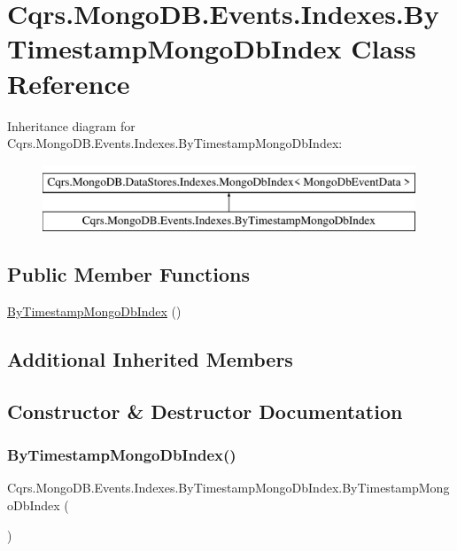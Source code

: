 \hypertarget{classCqrs_1_1MongoDB_1_1Events_1_1Indexes_1_1ByTimestampMongoDbIndex}{}\section{Cqrs.\+Mongo\+D\+B.\+Events.\+Indexes.\+By\+Timestamp\+Mongo\+Db\+Index Class Reference}
\label{classCqrs_1_1MongoDB_1_1Events_1_1Indexes_1_1ByTimestampMongoDbIndex}
Inheritance diagram for Cqrs.\+Mongo\+D\+B.\+Events.\+Indexes.\+By\+Timestamp\+Mongo\+Db\+Index\+:\begin{figure}[H]
\begin{center}
\leavevmode
\includegraphics[height=2.000000cm]{classCqrs_1_1MongoDB_1_1Events_1_1Indexes_1_1ByTimestampMongoDbIndex}
\end{center}
\end{figure}
\subsection*{Public Member Functions}
\begin{DoxyCompactItemize}
\item 
\hyperlink{classCqrs_1_1MongoDB_1_1Events_1_1Indexes_1_1ByTimestampMongoDbIndex_a642c97e253eaa259cb64b627701540c0_a642c97e253eaa259cb64b627701540c0}{By\+Timestamp\+Mongo\+Db\+Index} ()
\end{DoxyCompactItemize}
\subsection*{Additional Inherited Members}


\subsection{Constructor \& Destructor Documentation}
\mbox{\label{classCqrs_1_1MongoDB_1_1Events_1_1Indexes_1_1ByTimestampMongoDbIndex_a642c97e253eaa259cb64b627701540c0_a642c97e253eaa259cb64b627701540c0}} 
\subsubsection{\texorpdfstring{By\+Timestamp\+Mongo\+Db\+Index()}{ByTimestampMongoDbIndex()}}
{\footnotesize\ttfamily Cqrs.\+Mongo\+D\+B.\+Events.\+Indexes.\+By\+Timestamp\+Mongo\+Db\+Index.\+By\+Timestamp\+Mongo\+Db\+Index (\begin{DoxyParamCaption}{ }\end{DoxyParamCaption})}

